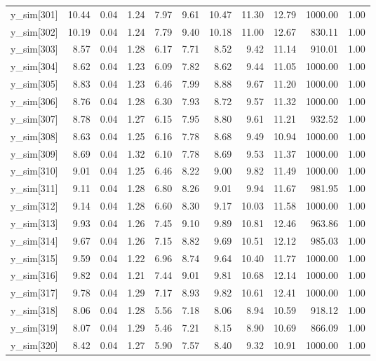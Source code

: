 \begin{table}[ht]
\begin{tabular}{rrrrrrrrrrr}
  y\_sim[301] & 10.44 & 0.04 & 1.24 & 7.97 & 9.61 & 10.47 & 11.30 & 12.79 & 1000.00 & 1.00 \\ 
  y\_sim[302] & 10.19 & 0.04 & 1.24 & 7.79 & 9.40 & 10.18 & 11.00 & 12.67 & 830.11 & 1.00 \\ 
  y\_sim[303] & 8.57 & 0.04 & 1.28 & 6.17 & 7.71 & 8.52 & 9.42 & 11.14 & 910.01 & 1.00 \\ 
  y\_sim[304] & 8.62 & 0.04 & 1.23 & 6.09 & 7.82 & 8.62 & 9.44 & 11.05 & 1000.00 & 1.00 \\ 
  y\_sim[305] & 8.83 & 0.04 & 1.23 & 6.46 & 7.99 & 8.88 & 9.67 & 11.20 & 1000.00 & 1.00 \\ 
  y\_sim[306] & 8.76 & 0.04 & 1.28 & 6.30 & 7.93 & 8.72 & 9.57 & 11.32 & 1000.00 & 1.00 \\ 
  y\_sim[307] & 8.78 & 0.04 & 1.27 & 6.15 & 7.95 & 8.80 & 9.61 & 11.21 & 932.52 & 1.00 \\ 
  y\_sim[308] & 8.63 & 0.04 & 1.25 & 6.16 & 7.78 & 8.68 & 9.49 & 10.94 & 1000.00 & 1.00 \\ 
  y\_sim[309] & 8.69 & 0.04 & 1.32 & 6.10 & 7.78 & 8.69 & 9.53 & 11.37 & 1000.00 & 1.00 \\ 
  y\_sim[310] & 9.01 & 0.04 & 1.25 & 6.46 & 8.22 & 9.00 & 9.82 & 11.49 & 1000.00 & 1.00 \\ 
  y\_sim[311] & 9.11 & 0.04 & 1.28 & 6.80 & 8.26 & 9.01 & 9.94 & 11.67 & 981.95 & 1.00 \\ 
  y\_sim[312] & 9.14 & 0.04 & 1.28 & 6.60 & 8.30 & 9.17 & 10.03 & 11.58 & 1000.00 & 1.00 \\ 
  y\_sim[313] & 9.93 & 0.04 & 1.26 & 7.45 & 9.10 & 9.89 & 10.81 & 12.46 & 963.86 & 1.00 \\ 
  y\_sim[314] & 9.67 & 0.04 & 1.26 & 7.15 & 8.82 & 9.69 & 10.51 & 12.12 & 985.03 & 1.00 \\ 
  y\_sim[315] & 9.59 & 0.04 & 1.22 & 6.96 & 8.74 & 9.64 & 10.40 & 11.77 & 1000.00 & 1.00 \\ 
  y\_sim[316] & 9.82 & 0.04 & 1.21 & 7.44 & 9.01 & 9.81 & 10.68 & 12.14 & 1000.00 & 1.00 \\ 
  y\_sim[317] & 9.78 & 0.04 & 1.29 & 7.17 & 8.93 & 9.82 & 10.61 & 12.41 & 1000.00 & 1.00 \\ 
  y\_sim[318] & 8.06 & 0.04 & 1.28 & 5.56 & 7.18 & 8.06 & 8.94 & 10.59 & 918.12 & 1.00 \\ 
  y\_sim[319] & 8.07 & 0.04 & 1.29 & 5.46 & 7.21 & 8.15 & 8.90 & 10.69 & 866.09 & 1.00 \\ 
  y\_sim[320] & 8.42 & 0.04 & 1.27 & 5.90 & 7.57 & 8.40 & 9.32 & 10.91 & 1000.00 & 1.00 \\ 

\end{tabular}
\end{table}
